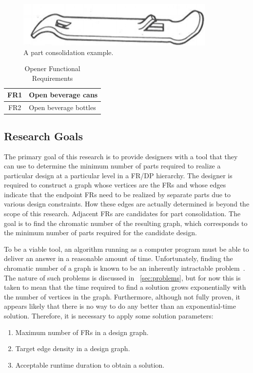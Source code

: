 \begin{figure}[H]
  \centering
  \includegraphics{opener}
  \caption{A part consolidation example.}
  \label{fig:opener}
\end{figure}

\begin{table}[H]
  \caption{Opener Functional Requirements}
  \label{tab:opener}
  \centering
  \begin{tabular}{|c|l|}
    \hline
    FR1 & Open beverage cans \\
    \hline
    FR2 & Open beverage bottles \\
    \hline
  \end{tabular}
\end{table}

\subsection{Research Goals}\label{sec:sub:goals}

The primary goal of this research is to provide designers with a tool that they can use to determine the minimum
number of parts required to realize a particular design at a particular level in a FR/DP hierarchy.  The designer
is required to construct a graph whose vertices are the FRs and whose edges indicate that the endpoint FRs need to
be realized by separate parts due to various design constraints.  How these edges are actually determined is beyond
the scope of this research.  Adjacent FRs are candidates for part consolidation.  The goal is to find the chromatic
number of the resulting graph, which corresponds to the minimum number of parts required for the candidate design.

To be a viable tool, an algorithm running as a computer program must be able to deliver an answer in a reasonable
amount of time.  Unfortunately, finding the chromatic number of a graph is known to be an inherently intractable
problem~\cite{garey}.  The nature of such problems is discussed in \sectionname~\ref{sec:problems}, but for now
this is taken to mean that the time required to find a solution grows exponentially with the number of vertices in
the graph.  Furthermore, although not fully proven, it appears likely that there is no way to do any better than an
exponential-time solution.  Therefore, it is necessary to apply some solution parameters:
\begin{enumerate}
\item Maximum number of FRs in a design graph.
\item Target edge density in a design graph.
\item Acceptable runtime duration to obtain a solution.
\end{enumerate}

